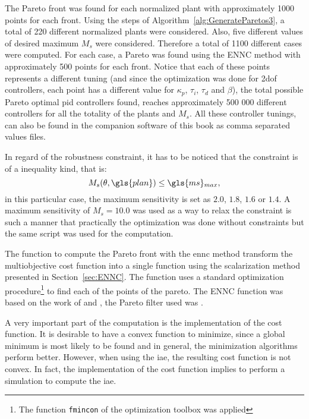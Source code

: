 The Pareto front was found for each normalized plant with approximately 1000 points for each front. Using the steps of Algorithm~\ref{alg:GenerateParetos3}, a total of 220 different normalized plants were considered. Also, five different values of desired maximum $M_s$ were considered. Therefore a total of 1100 different cases were computed. For each case, a Pareto was found using the ENNC method with approximately 500 points for each front. Notice that each of these points represents a different tuning (and since the optimization was done for \gls{2dof} controllers, each point has a different value for $\kappa_p$, $\tau_i$, $\tau_d$ and $\beta$), the total possible Pareto optimal \gls{pid} controllers found, reaches approximately 500 000 different controllers for all the totality of the plants and $M_s$. All these controller tunings, can also be found in the companion software of this book as comma separated values files.

In regard of the robustness constraint, it has to be noticed that the constraint is of a inequality kind, that is:
\begin{equation*}
	M_s(\theta, \gls{plan}) \leq \gls{ms}\mbox{}_{max},
\end{equation*} 
in this particular case, the maximum sensitivity is set as $2.0$, $1.8$, $1.6$ or $1.4$. A maximum sensitivity of $M_s = 10.0$ was used as a way to relax the constraint is such a manner that practically the optimization was done without constraints but the same script was used for the computation.

The function to compute the Pareto front with the \gls{ennc} method transform the multiobjective cost function into a single function using the scalarization method presented in Section~\ref{sec:ENNC}. The function uses a standard optimization procedure\footnote{The function \texttt{fmincon} of the \matlab{} optimization toolbox was applied} to find each of the points of the pareto. The ENNC function was based on the work of \cite{Houska2011} and \cite{Logist2012}, the Pareto filter used was \cite{Cao2020}.

A very important part of the computation is the implementation of the cost function. It is desirable to have a convex function to minimize, since a global minimum is most likely to be found and in general, the minimization algorithms perform better. However, when using the \gls{iae}, the resulting cost function is not convex. In fact, the implementation of the cost function implies to perform a simulation to compute the \gls{iae}.


